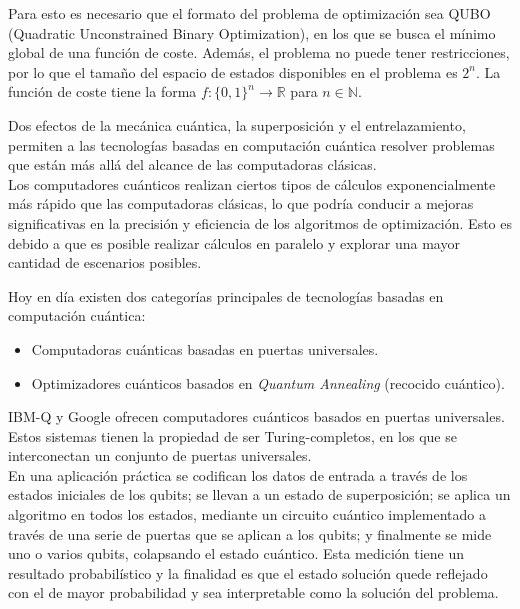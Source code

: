 Para esto es necesario que el formato del problema de optimización sea QUBO (Quadratic Unconstrained Binary Optimization), en los que se busca el mínimo global de una función de coste.
Además, el problema no puede tener restricciones, por lo que el tamaño del espacio de estados disponibles en el problema es $2^n$.
La función de coste tiene la forma $f: {\{0, 1\}}^n \rightarrow \mathbb{R}$ para $n \in \mathbb{N}$.


Dos efectos de la mecánica cuántica, la superposición y el entrelazamiento, permiten a las tecnologías basadas en computación cuántica resolver problemas que están más allá del alcance de las computadoras clásicas.
\\
Los computadores cuánticos realizan ciertos tipos de cálculos exponencialmente más rápido que las computadoras clásicas, lo que podría conducir a mejoras significativas en la precisión y eficiencia de los algoritmos de optimización.
Esto es debido a que es posible realizar cálculos en paralelo y explorar una mayor cantidad de escenarios posibles.

Hoy en día existen dos categorías principales de tecnologías basadas en computación cuántica:
\begin{itemize}
\item Computadoras cuánticas basadas en puertas universales.

\item Optimizadores cuánticos basados en \textit{Quantum Annealing} (recocido cuántico).
\end{itemize}

IBM-Q y Google ofrecen computadores cuánticos basados en puertas universales.
Estos sistemas tienen la propiedad de ser Turing-completos, en los que se interconectan un conjunto de puertas universales.
\\
En una aplicación práctica se codifican los datos de entrada a través de los estados iniciales de los qubits; se llevan a un estado de superposición; se aplica un algoritmo en todos los estados, mediante un circuito cuántico implementado a través de una serie de puertas que se aplican a los qubits; y finalmente se mide uno o varios qubits, colapsando el estado cuántico.
Esta medición tiene un resultado probabilístico y la finalidad es que el estado solución quede reflejado con el de mayor probabilidad y sea interpretable como la solución del problema.

